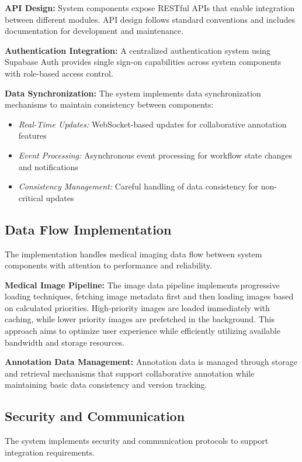 \textbf{API Design:} System components expose RESTful APIs that enable integration between different modules. API design follows standard conventions and includes documentation for development and maintenance.

\textbf{Authentication Integration:} A centralized authentication system using Supabase Auth provides single sign-on capabilities across system components with role-based access control.

\textbf{Data Synchronization:} The system implements data synchronization mechanisms to maintain consistency between components:

\begin{itemize}
    \item \textit{Real-Time Updates:} WebSocket-based updates for collaborative annotation features
    \item \textit{Event Processing:} Asynchronous event processing for workflow state changes and notifications
    \item \textit{Consistency Management:} Careful handling of data consistency for non-critical updates
\end{itemize}

\subsection{Data Flow Implementation}

The implementation handles medical imaging data flow between system components with attention to performance and reliability.

\textbf{Medical Image Pipeline:} The image data pipeline implements progressive loading techniques, fetching image metadata first and then loading images based on calculated priorities. High-priority images are loaded immediately with caching, while lower priority images are prefetched in the background. This approach aims to optimize user experience while efficiently utilizing available bandwidth and storage resources.

\textbf{Annotation Data Management:} Annotation data is managed through storage and retrieval mechanisms that support collaborative annotation while maintaining basic data consistency and version tracking.

\subsection{Security and Communication}

The system implements security and communication protocols to support integration requirements.

